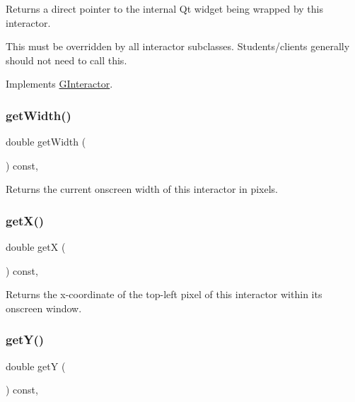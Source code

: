 Returns a direct pointer to the internal Qt widget being wrapped by this interactor. 

This must be overridden by all interactor subclasses. Students/clients generally should not need to call this. 

Implements \mbox{\hyperlink{classsgl_1_1GInteractor}{G\+Interactor}}.

\mbox{\label{classsgl_1_1GInteractor_a0ed2965abd4f5701d2cadf71239faf19}} 
\subsubsection{\texorpdfstring{get\+Width()}{getWidth()}}
{\footnotesize\ttfamily double get\+Width (\begin{DoxyParamCaption}{ }\end{DoxyParamCaption}) const\hspace{0.3cm}{\ttfamily [virtual]}, {\ttfamily [inherited]}}



Returns the current onscreen width of this interactor in pixels. 

\mbox{\label{classsgl_1_1GInteractor_a344385751bee0720059403940d57a13e}} 
\subsubsection{\texorpdfstring{get\+X()}{getX()}}
{\footnotesize\ttfamily double getX (\begin{DoxyParamCaption}{ }\end{DoxyParamCaption}) const\hspace{0.3cm}{\ttfamily [virtual]}, {\ttfamily [inherited]}}



Returns the x-\/coordinate of the top-\/left pixel of this interactor within its onscreen window. 

\mbox{\label{classsgl_1_1GInteractor_aafa51c7f8f38a09febbb9ce7853f77b4}} 
\subsubsection{\texorpdfstring{get\+Y()}{getY()}}
{\footnotesize\ttfamily double getY (\begin{DoxyParamCaption}{ }\end{DoxyParamCaption}) const\hspace{0.3cm}{\ttfamily [virtual]}, {\ttfamily [inherited]}}




